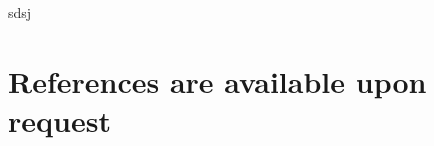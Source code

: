 \documentclass[line]{res}
\newenvironment{p1}
{\begin{adjustwidth}{-30pt}{0pt}
\vspace{8pt}}
{\end{adjustwidth}}
\begin{document}
\begin{resume}
\begin{p1}
\begin{etaremune}
		\end{etaremune}
	\end{p1}
		sdsj

	\section{References are available upon request}





\end{resume}
\end{document}
